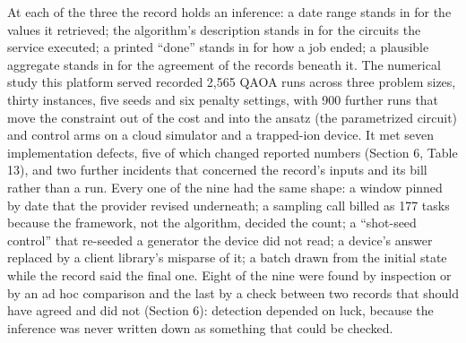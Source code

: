 \documentclass[acmsmall,screen,review]{acmart}
\begin{document}
At each of the three the record holds an inference: a date range stands in for the values it retrieved; the algorithm's description stands in for the circuits the service executed; a printed ``done'' stands in for how a job ended; a plausible aggregate stands in for the agreement of the records beneath it. The numerical study this platform served \cite{ref1} recorded 2,565 QAOA runs across three problem sizes, thirty instances, five seeds and six penalty settings, with 900 further runs that move the constraint out of the cost and into the ansatz (the parametrized circuit) and control arms on a cloud simulator and a trapped-ion device. It met seven implementation defects, five of which changed reported numbers (Section 6, Table 13), and two further incidents that concerned the record's inputs and its bill rather than a run. Every one of the nine had the same shape: a window pinned by date that the provider revised underneath; a sampling call billed as 177 tasks because the framework, not the algorithm, decided the count; a ``shot-seed control'' that re-seeded a generator the device did not read; a device's answer replaced by a client library's misparse of it; a batch drawn from the initial state while the record said the final one. Eight of the nine were found by inspection or by an ad hoc comparison and the last by a check between two records that should have agreed and did not (Section 6): detection depended on luck, because the inference was never written down as something that could be checked.
\end{document}
